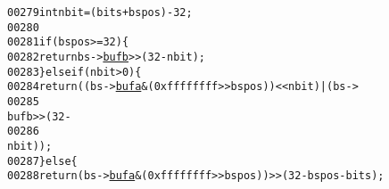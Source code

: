 \begin{footnotesize}
\begin{alltt}
00279         \textcolor{keywordtype}{int} nbit = (bits + bspos) - 32;
00280 
00281         \textcolor{keywordflow}{if} (bspos >= 32) \{
00282                 \textcolor{keywordflow}{return} bs->\hyperlink{struct_bitstream_af88938159f6b589af03d736e9fe8119e}{bufb} >> (32 - nbit);
00283         \} \textcolor{keywordflow}{else}  \textcolor{keywordflow}{if} (nbit > 0) \{
00284                 \textcolor{keywordflow}{return} ((bs->\hyperlink{struct_bitstream_a2b3b7e703efb5f16a9b122862f6342ff}{bufa} & (0xffffffff >> bspos)) << nbit) | (bs->
00285                                                                                                                                  
      bufb >> (32 -
00286                                                                                                                                                  
       nbit));
00287         \} \textcolor{keywordflow}{else} \{
00288                 \textcolor{keywordflow}{return} (bs->\hyperlink{struct_bitstream_a2b3b7e703efb5f16a9b122862f6342ff}{bufa} & (0xffffffff >> bspos)) >> (32 - bspos - bits);
      

\end{alltt}
\end{footnotesize}

